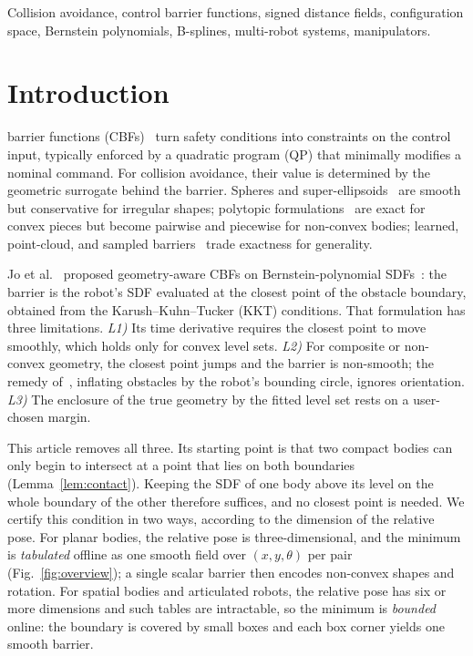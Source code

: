 \documentclass[journal]{IEEEtran}
\theoremstyle{definition}
\begin{document}
\begin{IEEEkeywords}
Collision avoidance, control barrier functions, signed distance fields, configuration space,
Bernstein polynomials, B-splines, multi-robot systems, manipulators.
\end{IEEEkeywords}

\section{Introduction}\label{sec:intro}

 barrier functions (CBFs)~\cite{ames2019cbf} turn safety conditions into
constraints on the control input, typically enforced by a quadratic program (QP) that minimally
modifies a nominal command. For collision avoidance, their value is determined by the geometric
surrogate behind the barrier. Spheres and super-ellipsoids~\cite{wang2017safety,wang2017quadrotors}
are smooth but conservative for irregular shapes; polytopic
formulations~\cite{chen2025minkowski,thirugnanam2025strongly} are exact for convex pieces but become
pairwise and piecewise for non-convex bodies; learned, point-cloud, and sampled
barriers~\cite{khan2022gaussian,long2021learning,dai2024sailing,lutkus2025sampling} trade exactness
for generality.

Jo et al.~\cite{jo2026geometry} proposed geometry-aware CBFs on Bernstein-polynomial
SDFs~\cite{li2024representing}: the barrier is the robot's SDF evaluated at the closest point of the
obstacle boundary, obtained from the Karush--Kuhn--Tucker (KKT) conditions. That formulation has
three limitations. \emph{L1)} Its time derivative requires the closest point to move smoothly, which
holds only for convex level sets. \emph{L2)} For composite or non-convex geometry, the closest point
jumps and the barrier is non-smooth; the remedy of~\cite{jo2026geometry}, inflating obstacles by
the robot's bounding circle, ignores orientation. \emph{L3)} The enclosure of the true geometry by
the fitted level set rests on a user-chosen margin.

This article removes all three. Its starting point is that two compact bodies can only begin to
intersect at a point that lies on both boundaries (Lemma~\ref{lem:contact}). Keeping the SDF of one
body above its level on the whole boundary of the other therefore suffices, and no closest point is
needed. We certify this condition in two ways, according to the dimension of the relative pose.
For planar bodies, the relative pose is three-dimensional, and the minimum is \emph{tabulated}
offline as one smooth field over $(x,y,\theta)$ per pair (Fig.~\ref{fig:overview}); a single scalar
barrier then encodes non-convex shapes and rotation. For spatial bodies and articulated robots, the
relative pose has six or more dimensions and such tables are intractable, so the minimum is
\emph{bounded} online: the boundary is covered by small boxes and each box corner yields one smooth
barrier.
\end{document}

